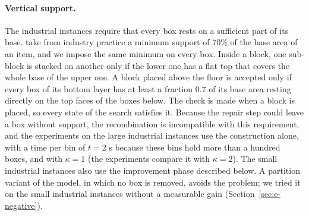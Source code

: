 \paragraph{Vertical support.}
The industrial instances require that every box rests on a sufficient part of its base.
\citet{Elhedhli2019} take from industry practice a minimum support of 70\% of the base area of
an item, and we impose the same minimum on every box. Inside a block, one sub-block is stacked on
another only if the lower one has a flat top that covers the whole base of the upper one. A block
placed above the floor is accepted only if every box of its bottom layer has at least a fraction
$0.7$ of its base area resting directly on the top faces of the boxes below. The check is made
when a block is placed, so every state of the search satisfies it. Because the repair step
could leave a box without support, the recombination is incompatible with this requirement, and
the experiments on the large industrial instances use the construction alone, with a time per
bin of $t=2$ s because these bins hold more than a hundred boxes, and with $\kappa=1$ (the
experiments compare it with $\kappa=2$). The small industrial instances also use the improvement phase described below. A partition variant of the model, in which no box is removed, avoids the problem; we
tried it on the small industrial instances without a measurable gain
(Section~\ref{sec:e-negative}).

